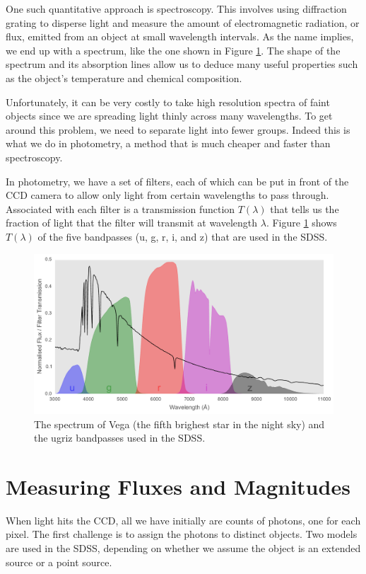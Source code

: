 One such quantitative approach is spectroscopy. This involves
using diffraction grating to disperse light and measure the amount of electromagnetic radiation,
or flux, emitted from an object at small wavelength intervals. As the name implies, we end
up with a spectrum, like the one shown in Figure \ref{fig:vega}. The shape of the spectrum
and its absorption lines allow us to deduce many useful properties such as the object's
temperature and chemical composition.

Unfortunately, it can be very costly to take high resolution spectra of faint objects since
we are spreading light thinly across many wavelengths. To get around this problem, we need
to separate light into fewer groups. Indeed this is what we do in photometry, a method
that is much cheaper and faster than spectroscopy.

In photometry, we have a set of filters, each of which can be put in front of the CCD
camera to allow only light from certain wavelengths to pass through. Associated with
each filter is a transmission function $T(\lambda)$ that tells us
the fraction of light that the filter will transmit at wavelength $\lambda$.
Figure \ref{fig:vega} shows $T(\lambda)$ of the five bandpasses (u, g, r, i, and z) that
are used in the SDSS.


\begin{figure}[tbp]
	\centering
	\includegraphics[width=\textwidth]{figures/vega_filters_and_spectrum}
	\caption[The spectrum of the star Vega and the ugriz band passes]{The spectrum of Vega
		(the fifth brighest star in the night sky) and the ugriz bandpasses used in the SDSS.}
	\label{fig:vega} 
\end{figure}


\section{Measuring Fluxes and Magnitudes}
\label{sec:mag}
When light hits the CCD, all we have initially are counts of photons, one for each pixel.
The first challenge is to assign the photons to distinct objects. Two models are used
in the SDSS, depending on whether we assume the object is an extended source or a point source.


